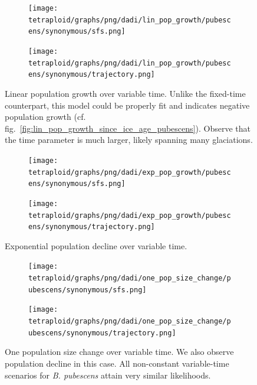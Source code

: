 \documentclass[hidelinks,11pt]{article}
\newcommand{\pubescens}{\textit{B. pubescens}}
\begin{document}
    \begin{figure}[H]
        \centering
        \begin{subfigure}[b]{0.465\textwidth}
            \texttt{[image: tetraploid/graphs/png/dadi/lin\_pop\_growth/pubescens/synonymous/sfs.png]}
        \end{subfigure}
        \hfill
        \begin{subfigure}[b]{0.525\textwidth}
            \texttt{[image: tetraploid/graphs/png/dadi/lin\_pop\_growth/pubescens/synonymous/trajectory.png]}
        \end{subfigure}
        \caption{Linear population growth over variable time. Unlike the fixed-time counterpart, this model could be properly fit and indicates negative population growth (cf. fig.~\ref{fig:lin_pop_growth_since_ice_age_pubescens}). Observe that the time parameter is much larger, likely spanning many glaciations.}
        \label{fig:lin_pop_growth_pubescens}
    \end{figure}

    \begin{figure}[H]
        \centering
        \begin{subfigure}[b]{0.465\textwidth}
            \texttt{[image: tetraploid/graphs/png/dadi/exp\_pop\_growth/pubescens/synonymous/sfs.png]}
        \end{subfigure}
        \hfill
        \begin{subfigure}[b]{0.525\textwidth}
            \texttt{[image: tetraploid/graphs/png/dadi/exp\_pop\_growth/pubescens/synonymous/trajectory.png]}
        \end{subfigure}
        \caption{Exponential population decline over variable time.}
        \label{fig:exp_pop_growth_pubescens}
    \end{figure}

    \begin{figure}[H]
        \centering
        \begin{subfigure}[b]{0.465\textwidth}
            \texttt{[image: tetraploid/graphs/png/dadi/one\_pop\_size\_change/pubescens/synonymous/sfs.png]}
        \end{subfigure}
        \hfill
        \begin{subfigure}[b]{0.525\textwidth}
            \texttt{[image: tetraploid/graphs/png/dadi/one\_pop\_size\_change/pubescens/synonymous/trajectory.png]}
        \end{subfigure}
        \caption{One population size change over variable time. We also observe population decline in this case. All non-constant variable-time scenarios for \pubescens{} attain very similar likelihoods. }
        \label{fig:one_pop_size_change_pubescens}
    \end{figure}
\end{document}
